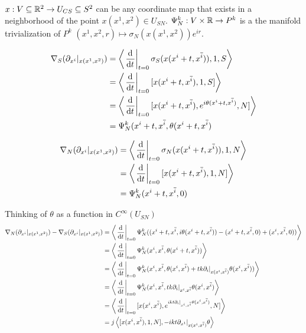 $x: V \subseteq \mathbb{R}^2 \to U_{CS} \subseteq S^2$ can be any coordinate map that exists in a neighborhood of the point $x(x^1, x^2) \in U_{SN}$. $\Psi^k_N: V \times \mathbb{R} \to P^k$ is a the manifold trivialization of $P^k$ $(x^1, x^2, r) \mapsto \sigma_N(x(x^1, x^2))e^{ir}$.

\begin{align*}
    \nabla_S(\partial_{x^i}|_{x(x^1, x^2)}) &= \cl{\der{t}[t = 0] \sigma_S(x(x^{i} + t, x^{\overline{i}})), 1, S} \\
        &= \cl{ \der{t}[t = 0] [x(x^{i} + t, x^{\overline{i}}),  1, S] } \\
        &= \cl{ \der{t}[t = 0] [x(x^{i} + t, x^{\overline{i}}),  e^{i \theta(x^{i} + t, x^{\overline{i}})}, N] }\\
        &= \Psi^k_N  (x^{i} + t, x^{\overline{i}},  \theta(x^{i} + t, x^{\overline{i}})
\end{align*}

\begin{align*}
    \nabla_N(\partial_{x^i}|_{x(x^1, x^2)}) &= \cl{\der{t}[t = 0] \sigma_N(x(x^{i} + t, x^{\overline{i}})), 1, N} \\
        &= \cl{ \der{t}[t = 0] [x(x^{i} + t, x^{\overline{i}}),  1, N] }\\
        &= \Psi^k_N  (x^{i} + t, x^{\overline{i}}, 0)
\end{align*}

Thinking of $\theta$ as a function in $C^\infty(U_{SN})$
\begin{align*}
    \nabla_N(\partial_{x^i}|_{x(x^1, x^2)}) - \nabla_S(\partial_{x^i}|_{x(x^1, x^2)}) &=
        \cl{\der{t}[t = 0] \Psi^k_N(  (x^{i} + t, x^{\overline{i}},  i \theta(x^{i} + t, x^{\overline{i}})) - (x^{i} + t, x^{\overline{i}}, 0) + (x^{i}, x^{\overline{i}}, 0) ) } \\
        &= \cl{\der{t}[t = 0] \Psi^k_N(  x^{i}, x^{\overline{i}}, \theta(x^{i} + t, x^{\overline{i}} ))}\\
        &= \cl{\der{t}[t = 0] \Psi^k_N(  x^{i}, x^{\overline{i}},  \theta(x^{i}, x^{\overline{i}}) +  tk \partial_i|_{x(x^{i}, x^{\overline{i}})} \theta(x^{i}, x^{\overline{i}})) }\\
        &= \cl{\der{t}[t = 0] \Psi^k_N(  x^{i}, x^{\overline{i}}, tk \partial_i|_{x^{i}, x^{\overline{i}}} \theta(x^{i}, x^{\overline{i}}) }\\ %
        &= \cl{ \der{t}[t = 0] [x(x^{i}, x^{\overline{i}}), e^{ikt \partial_i|_{x^{i}, x^{\overline{i}}} \theta(x^{i}, x^{\overline{i}})}, N] } \\
        &= j\cl{ [x(x^{i}, x^{\overline{i}}), 1, N], -ikt \partial_{x^1}|_{x(x^{i}, x^{\overline{i}})} \theta }
\end{align*}

